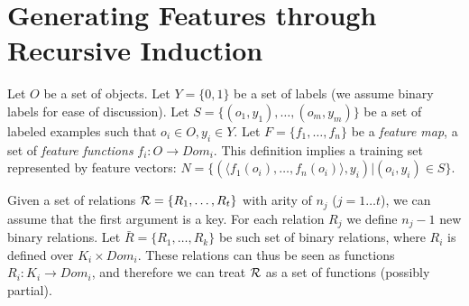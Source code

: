 \documentclass[twoside,11pt]{article}
\theoremstyle{definition}
\begin{document}


\section{Generating Features through Recursive Induction}

Let $O$ be a set of objects. Let $Y=\{0,1\}$ be a set of labels (we assume binary labels for ease of discussion). Let $S=\{(o_{1},y_{1}),\ldots,(o_{m},y_{m})\}$ be a set of labeled examples such that $o_{i}\in O, y_{i}\in Y$. Let $F=\{f_{1},\ldots,f_{n}\}$ be a \emph{feature map}, a set of \emph{feature functions} $f_{i}:O\rightarrow Dom_{i}$.  This definition implies a training set represented by feature vectors: $N=\{ (\langle f_1(o_i),\ldots,f_n(o_i)\rangle, y_i) | (o_i,y_i) \in S\}$.

Given a set of relations ${\cal R}=\{R_{1},\ldots,R_{t}\}$ with arity of $n_{j}$ ($j=1\ldots t$), we can assume  that the first argument is a key. For each relation $R_{j}$ we define $n_{j}-1$ new binary relations.
Let $\bar{R}=\{R_{1},\ldots,R_{k}\}$ be such set of binary relations, where $R_{i}$ is defined over $K_{i}\times Dom_{i}$. These relations can thus be seen as functions $R_{i}: K_{i}\rightarrow Dom_{i}$, and therefore we can treat ${\cal R}$ as a set of functions (possibly partial).
\end{document}
